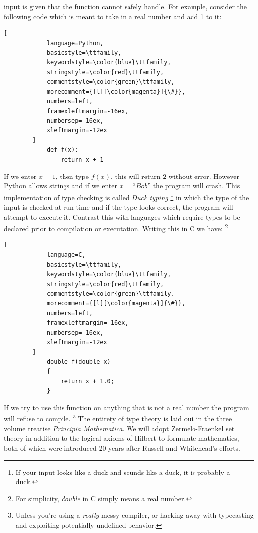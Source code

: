         input is given that the function cannot safely handle. For example,
        consider the following code which is meant to take in a real number and
        add 1 to it:
        \begin{lstlisting}[
            language=Python,
            basicstyle=\ttfamily,
            keywordstyle=\color{blue}\ttfamily,
            stringstyle=\color{red}\ttfamily,
            commentstyle=\color{green}\ttfamily,
            morecomment={[l][\color{magenta}]{\#}},
            numbers=left,
            framexleftmargin=-16ex,
            numbersep=-16ex,
            xleftmargin=-12ex
        ]
            def f(x):
                return x + 1
        \end{lstlisting}
        If we enter $x=1$, then type $f(x)$, this will return 2 without error.
        However Python allows strings and if we enter $x=\textit{``Bob''}$ the
        program will crash. This implementation of type checking is called
        \textit{Duck typing}%
        \footnote{%
            If your input looks like a duck and sounds like a duck, it is
            probably a duck.
        }
        in which the type of the input is checked at run time and if the type
        looks correct, the program will attempt to execute it. Contrast this
        with languages which require types to be declared prior to compilation
        or executation. Writing this in C we have:%
        \footnote{%
            For simplicity, \textit{double} in C simply means a real number.
        }
        \begin{lstlisting}[
            language=C,
            basicstyle=\ttfamily,
            keywordstyle=\color{blue}\ttfamily,
            stringstyle=\color{red}\ttfamily,
            commentstyle=\color{green}\ttfamily,
            morecomment={[l][\color{magenta}]{\#}},
            numbers=left,
            framexleftmargin=-16ex,
            numbersep=-16ex,
            xleftmargin=-12ex
        ]
            double f(double x)
            {
                return x + 1.0;
            }
        \end{lstlisting}
        If we try to use this function on anything that is not a real number
        the program will refuse to compile.%
        \footnote{%
            Unless you're using a \textit{really} messy compiler, or hacking
            away with typecasting and exploiting potentially undefined-behavior.
        }
        The entirety of type theory is laid out in the three volume
        treatise \textit{Principia Mathematica}. We will adopt Zermelo-Fraenkel
        set theory in addition to the logical
        axioms of Hilbert to formulate mathematics, both
        of which were introduced 20 years after Russell and Whitehead's efforts.
